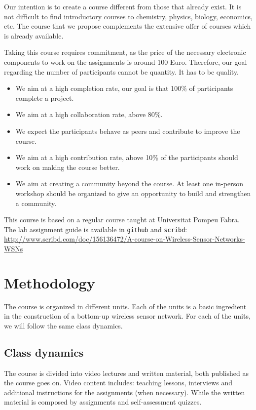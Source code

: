 \documentclass[a4paper,oneside]{book}   %
\begin{document}
Our intention is to create a course different from those that already exist.
It is not difficult to find introductory courses to chemistry, physics, biology, economics, etc.
The course that we propose complements the extensive offer of courses which is already available.

Taking this course requires commitment, as the price of the necessary electronic components to work on the assignments is around 100 Euro.
Therefore, our goal regarding the number of participants cannot be quantity.
It has to be quality.

\begin{itemize}
\item We aim at a high completion rate,  our goal is that 100\%  of participants complete a project.
\item We aim at a high collaboration rate, above 80\%.
\item We expect the participants behave as peers and contribute to improve the course.
\item We aim at a high contribution rate, above 10\% of the participants should work on making the course better.
\item We aim at creating a community beyond the course.
At least one in-person workshop should be organized to give an opportunity to build and strengthen a community.
\end{itemize}

This course is based on a regular course taught at Universitat Pompeu Fabra.
The lab assignment guide is available in \texttt{github} and \texttt{scribd}: \url{http://www.scribd.com/doc/156136472/A-course-on-Wireless-Sensor-Networks-WSNs}


\section{Methodology}

The course is organized in different units.
Each of the units is a basic ingredient in the construction of a bottom-up wireless sensor network.
For each of the units, we will follow the same class dynamics.

\subsection{Class dynamics}

The course is divided into video lectures and written material, both published as the course goes on. Video content includes: teaching lessons, interviews and additional instructions for the assignments (when necessary). While the written material is composed by assignments and self-assessment quizzes. 
\end{document}
